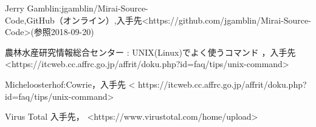 \begin{thebibliography}{10}
     Jerry Gamblin:jgamblin/Mirai-Source-\\Code,GitHub（オンライン）,入手先\textless https://github.com/jgamblin/Mirai-Source-Code\textgreater(参照2018-09-20)
 
    
    農林水産研究情報総合センター : UNIX(Linux)でよく使うコマンド ，入手先 \textless https:\slash\slash{}itcweb.cc.affrc.go.jp\slash{}affrit/doku.php?id=faq\slash{}tips\slash{}unix-command\textgreater 
    
    Micheloosterhof:Cowrie，入手先 \textless 
    https:\slash\slash{}itcweb.cc.affrc.go.jp\slash{}affrit\slash{}doku.php?id=faq\slash{}tips/unix-command\textgreater
    
    Virus Total 入手先，
    \textless https:\slash\slash{}www.virustotal.com\slash{}home\slash{}upload\textgreater
\end{thebibliography}
